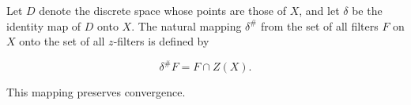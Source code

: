 Let $D$ denote the discrete space whose points are those of $X$, and let $\delta$ be the identity map of $D$ onto $X$. The natural mapping $\delta^\#$ from the set of all filters $F$ on $X$ onto the set of all $z$-filters is defined by

$$\delta^\# F = F \cap Z(X).$$

This mapping preserves convergence.
